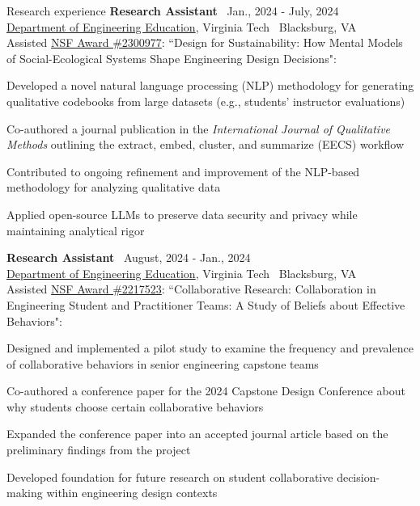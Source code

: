 \documentclass{resume}
\begin{document}
\begin{rSection}{Research experience}
{\bf Research Assistant} \hfill {\ Jan., 2024 - July, 2024 }\\ 
{\href{https://enge.vt.edu/}{Department of Engineering Education}, Virginia Tech} \hfill {\ {Blacksburg, VA}}\\
Assisted \href{https://www.nsf.gov/awardsearch/showAward?AWD_ID=2300977&HistoricalAwards=false}{NSF Award \#2300977}: ``Design for Sustainability: How Mental Models of Social-Ecological Systems Shape Engineering Design Decisions":
\begin{cvitems}
    \item Developed a novel natural language processing (NLP) methodology for generating qualitative codebooks from large datasets (e.g., students' instructor evaluations)
    \item Co-authored a journal publication in the \emph{International Journal of Qualitative Methods} outlining the extract, embed, cluster, and summarize (EECS) workflow
    \item Contributed to ongoing refinement and improvement of the NLP-based methodology for analyzing qualitative data
    \item Applied open-source LLMs to preserve data security and privacy while maintaining analytical rigor
\end{cvitems}


{\bf Research Assistant} \hfill {\ August, 2024 - Jan., 2024 }\\ 
{\href{https://enge.vt.edu/}{Department of Engineering Education}, Virginia Tech} \hfill {\ {Blacksburg, VA}}\\
Assisted \href{https://www.nsf.gov/awardsearch/showAward?AWD_ID=2217523&HistoricalAwards=false}{NSF Award \#2217523}: ``Collaborative Research: Collaboration in Engineering Student and Practitioner Teams: A Study of Beliefs about Effective Behaviors":
\begin{cvitems}
    \item Designed and implemented a pilot study to examine the frequency and prevalence of collaborative behaviors in senior engineering capstone teams
    \item Co-authored a conference paper for the 2024 Capstone Design Conference about why students choose certain collaborative behaviors
    \item Expanded the conference paper into an accepted journal article based on the preliminary findings from the project
    \item Developed foundation for future research on student collaborative decision-making within engineering design contexts
\end{cvitems}


\end{rSection}
\end{document}
